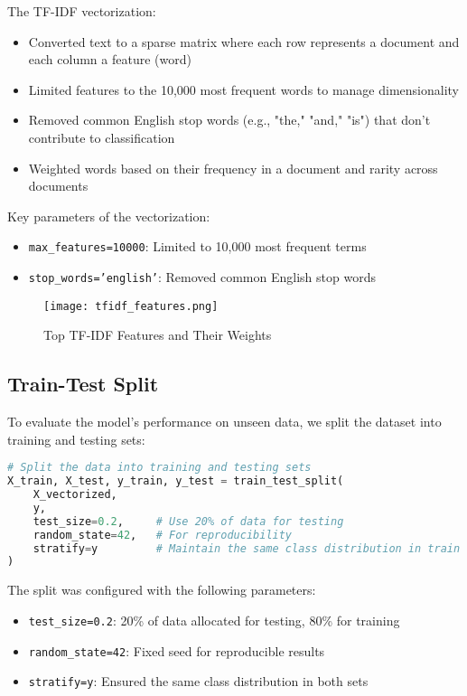 \documentclass[12pt]{article}
\begin{document}
The TF-IDF vectorization:
\begin{itemize}
    \item Converted text to a sparse matrix where each row represents a document and each column a feature (word)
    \item Limited features to the 10,000 most frequent words to manage dimensionality
    \item Removed common English stop words (e.g., "the," "and," "is") that don't contribute to classification
    \item Weighted words based on their frequency in a document and rarity across documents
\end{itemize}

Key parameters of the vectorization:
\begin{itemize}
    \item \texttt{max\_features=10000}: Limited to 10,000 most frequent terms
    \item \texttt{stop\_words='english'}: Removed common English stop words
\end{itemize}

\begin{figure}[h]
    \centering
    \texttt{[image: tfidf\_features.png]}
    \caption{Top TF-IDF Features and Their Weights}
\end{figure}

\subsection{Train-Test Split}
To evaluate the model's performance on unseen data, we split the dataset into training and testing sets:

\begin{lstlisting}[language=Python, caption=Train-Test Split Implementation]
# Split the data into training and testing sets
X_train, X_test, y_train, y_test = train_test_split(
    X_vectorized, 
    y, 
    test_size=0.2,     # Use 20% of data for testing
    random_state=42,   # For reproducibility
    stratify=y         # Maintain the same class distribution in train and test sets
)
\end{lstlisting}

The split was configured with the following parameters:
\begin{itemize}
    \item \texttt{test\_size=0.2}: 20\% of data allocated for testing, 80\% for training
    \item \texttt{random\_state=42}: Fixed seed for reproducible results
    \item \texttt{stratify=y}: Ensured the same class distribution in both sets
\end{itemize}
\end{document}
